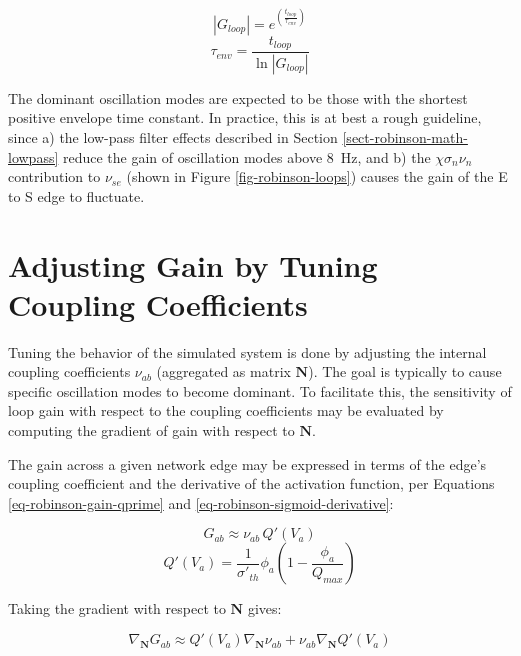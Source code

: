 \begin{equation}
| G_{loop} | = e^{\left ( \frac{t_{loop}}{\tau_{env}} \right )}
\label{eq-robinson-gaintau}
\end{equation}
%
\begin{equation}
\tau_{env} = \frac{t_{loop}}{\ln | G_{loop} |}
\label{eq-robinson-envtau}
\end{equation}

The dominant oscillation modes are expected to be those with the shortest
positive envelope time constant. In practice, this is at best a rough
guideline, since a) the low-pass filter effects described in Section
\ref{sect-robinson-math-lowpass} reduce the gain of oscillation modes above
8~Hz, and b) the $\chi \sigma_n \nu_n$ contribution to $\nu_{se}$ (shown in
Figure \ref{fig-robinson-loops}) causes the gain of the E to S edge to
fluctuate.

%
%
\section{Adjusting Gain by Tuning Coupling Coefficients}
\label{sect-robinson-math-tuning}
%
\newcommand{\deln}{\nabla_{\mathbf{N}}}

Tuning the behavior of the simulated system is done by adjusting the
internal coupling coefficients $\nu_{ab}$ (aggregated as matrix
$\mathbf{N}$). The goal is typically to cause specific oscillation modes
to become dominant. To facilitate this, the sensitivity of loop gain with
respect to the coupling coefficients may be evaluated by computing the
gradient of gain with respect to $\mathbf{N}$.

The gain across a given network edge may be expressed in terms of the
edge's coupling coefficient and the derivative of the activation function,
per Equations \ref{eq-robinson-gain-qprime} and
\ref{eq-robinson-sigmoid-derivative}:

\begin{equation}
G_{ab} \approx \nu_{ab} \, Q'(V_a)
\end{equation}
%
\begin{equation}
Q'(V_a) = \frac{1}{\sigma'_{th}} \phi_a
\left ( 1 - \frac{\phi_a}{Q_{max}} \right )
\end{equation}

Taking the gradient with respect to $\mathbf{N}$ gives:

\begin{equation}
\deln G_{ab} \approx Q'(V_a) \deln \nu_{ab} + \nu_{ab} \deln Q'(V_a)
\label{eq-robinson-gain-gradient}
\end{equation}

